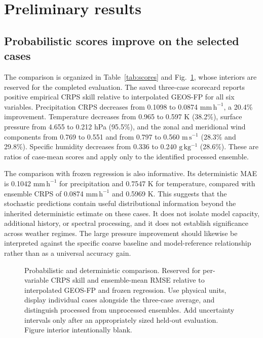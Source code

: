 \documentclass[10pt]{article}
\newcommand{\rainunit}{\mathrm{mm\,h^{-1}}}
\newcommand{\windunit}{\mathrm{m\,s^{-1}}}
\newcommand{\qrate}{\mathrm{g\,kg^{-1}}}
\newcommand{\blankpanel}[1]{\begingroup\setlength{\fboxsep}{0pt}\color{rulegray}\fbox{\rule{0pt}{#1}\rule{\dimexpr\linewidth-2\fboxrule\relax}{0pt}}\endgroup}
\newcommand{\figslot}[3]{\begin{figure}[t]\centering\blankpanel{#1}\caption{#2}\label{#3}\end{figure}}
\newcommand{\tableslot}[3]{\begin{table}[t]\caption{#2}\label{#3}\centering\blankpanel{#1}\end{table}}
\begin{document}
\tableslot{2.6cm}{Verification and ablation results. Reserved for the matched held-out comparison of interpolated GEOS-FP, frozen regression, a capacity-matched deterministic model, unprocessed flow, and spectrally processed flow. Report per-variable MAE, RMSE, bias, empirical and fair CRPS where available, ensemble size, and episode-block uncertainty intervals. Label three-case exploratory results separately from a complete test-set evaluation. Table body intentionally blank.}{tab:scores}

\section{Preliminary results}\label{sec:results}
\subsection{Probabilistic scores improve on the selected cases}
The comparison is organized in Table~\ref{tab:scores} and Fig.~\ref{fig:skill}, whose interiors are reserved for the completed evaluation. The saved three-case scorecard reports positive empirical CRPS skill relative to interpolated GEOS-FP for all six variables. Precipitation CRPS decreases from 0.1098 to 0.0874 $\rainunit$, a 20.4\% improvement. Temperature decreases from 0.965 to 0.597 K (38.2\%), surface pressure from 4.655 to 0.212 hPa (95.5\%), and the zonal and meridional wind components from 0.769 to 0.551 and from 0.797 to 0.560 $\windunit$ (28.3\% and 29.8\%). Specific humidity decreases from 0.336 to 0.240 $\qrate$ (28.6\%). These are ratios of case-mean scores and apply only to the identified processed ensemble.

The comparison with frozen regression is also informative. Its deterministic MAE is 0.1042 $\rainunit$ for precipitation and 0.7547 K for temperature, compared with ensemble CRPS of 0.0874 $\rainunit$ and 0.5969 K. This suggests that the stochastic predictions contain useful distributional information beyond the inherited deterministic estimate on these cases. It does not isolate model capacity, additional history, or spectral processing, and it does not establish significance across weather regimes. The large pressure improvement should likewise be interpreted against the specific coarse baseline and model-reference relationship rather than as a universal accuracy gain.

\figslot{3.8cm}{Probabilistic and deterministic comparison. Reserved for per-variable CRPS skill and ensemble-mean RMSE relative to interpolated GEOS-FP and frozen regression. Use physical units, display individual cases alongside the three-case average, and distinguish processed from unprocessed ensembles. Add uncertainty intervals only after an appropriately sized held-out evaluation. Figure interior intentionally blank.}{fig:skill}
\end{document}
